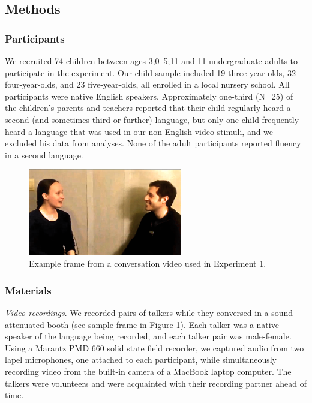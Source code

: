\documentclass[authoryear, 12pt]{elsarticle}
\begin{document}
\subsection{Methods}
\label{sec:methods1}

\subsubsection{Participants}

We recruited 74 children between ages 3;0--5;11 and 11 undergraduate adults to participate in the experiment. Our child sample included 19 three-year-olds, 32 four-year-olds, and 23 five-year-olds, all enrolled in a local nursery school. All participants were native English speakers. Approximately one-third (N=25) of the children's parents and teachers reported that their child regularly heard a second (and sometimes third or further) language, but only one child frequently heard a language that was used in our non-English video stimuli, and we excluded his data from analyses. None of the adult participants reported fluency in a second language.

\begin{figure}[t]
\begin{center}
\includegraphics[width=0.6\textwidth]{figures/FIG-FL-stim.png}
\end{center}
\caption{Example frame from a conversation video used in Experiment 1.} 
\label{fig:speakers}
\end{figure}

\subsubsection{Materials}

\textit{Video recordings}. We recorded pairs of talkers while they conversed in a sound-attenuated booth (see sample frame in Figure \ref{fig:speakers}). Each talker was a native speaker of the language being recorded, and each talker pair was male-female. Using a Marantz PMD 660 solid state field recorder, we captured audio from two lapel microphones, one attached to each participant, while simultaneously recording video from the built-in camera of a MacBook laptop computer. The talkers were volunteers and were acquainted with their recording partner ahead of time. 
\end{document}
